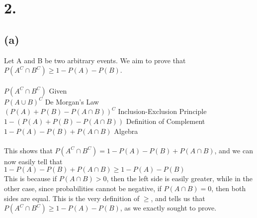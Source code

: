 \documentclass{article}
\begin{document}
\section*{2.}
{\Large

\subsection*{(a)}
Let A and B be two arbitrary events. We aim to prove that $P(A^C \cap B^C) \geq 1 - P(A) - P(B)$.  \\ \\ 
$P(A^C \cap B^C)$ \hfill Given\\ 
$P(A \cup B)^C$ \hfill De Morgan's Law\\ 
$(P(A) + P(B) - P(A \cap B))^C$ \hfill Inclusion-Exclusion Principle\\ 
$1 - (P(A) + P(B) - P(A \cap B))$ \hfill Definition of Complement\\ 
$1 - P(A) - P(B) + P(A \cap B)$ \hfill Algebra\\ \\
This shows that $P(A^C \cap B^C) = 1 - P(A) - P(B) + P(A \cap B)$, and we can now easily tell that \\
$1 - P(A) - P(B) + P(A \cap B) \geq 1 - P(A) - P(B)$ \\
This is because if $P(A \cap B) > 0$, then the left side is easily greater, while in the other case, since probabilities cannot be negative, if $P(A \cap B) = 0$, then both sides are equal. This is the very definition of $\geq$, and tells us that \\
$P(A^C \cap B^C) \geq 1 - P(A) - P(B)$, as we exactly sought to prove.

}
\end{document}

